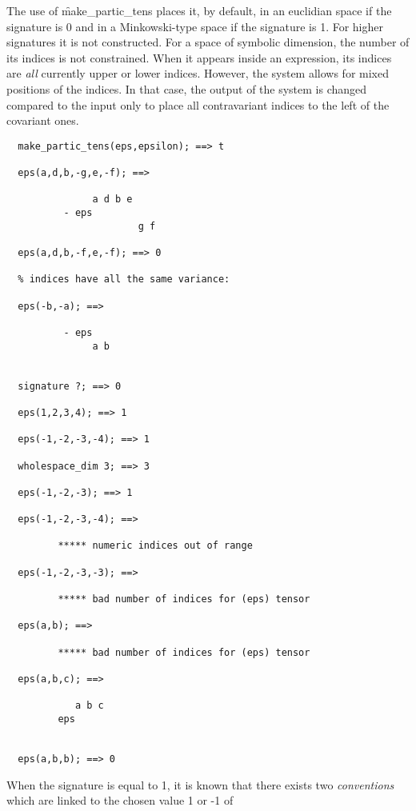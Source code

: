 The use of \f{make\_partic\_tens} places it, by default, in an
euclidian space if the signature is 0 and in a Minkowski-type space if
the signature%
 is 1.
For higher signatures it is not constructed.
For a space of symbolic dimension, the number of its indices is not
constrained. When it appears inside an expression, its indices are \emph{all}
currently upper or lower indices. However, the system allows for
mixed positions of the indices. In that case, the output of the system
is changed compared to the input  only to place all contravariant indices
to the left of the covariant ones.
\begin{verbatim}
  make_partic_tens(eps,epsilon); ==> t

  eps(a,d,b,-g,e,-f); ==>

               a d b e
          - eps
                       g f

  eps(a,d,b,-f,e,-f); ==> 0

  % indices have all the same variance:

  eps(-b,-a); ==>

          - eps
               a b


  signature ?; ==> 0

  eps(1,2,3,4); ==> 1

  eps(-1,-2,-3,-4); ==> 1

  wholespace_dim 3; ==> 3

  eps(-1,-2,-3); ==> 1

  eps(-1,-2,-3,-4); ==>

         ***** numeric indices out of range

  eps(-1,-2,-3,-3); ==>

         ***** bad number of indices for (eps) tensor

  eps(a,b); ==>

         ***** bad number of indices for (eps) tensor

  eps(a,b,c); ==>

            a b c
         eps


  eps(a,b,b); ==> 0
\end{verbatim}
When the signature%
 is equal to 1, it is known that
there exists
two \emph{conventions} which are linked to the chosen value 1 or -1 of
